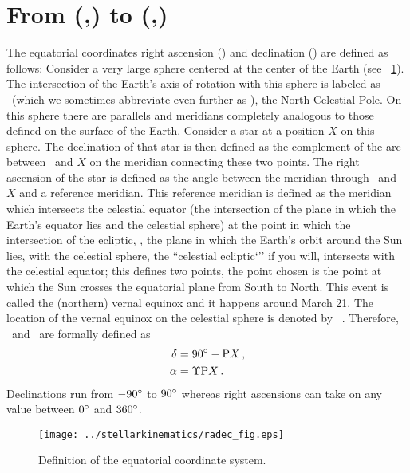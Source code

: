 
\section{From (\ra,\dec) to (\gall,\galb)}

The equatorial coordinates right ascension (\ra) and declination
(\dec) are defined as follows: Consider a very large sphere centered
at the center of the Earth (see \figurename~\ref{fig:eq}). The
intersection of the Earth's axis of rotation with this sphere is
labeled as \ncp\ (which we sometimes abbreviate even further as
\ncpp), the North Celestial Pole. On this sphere there are parallels
and meridians completely analogous to those defined on the surface of
the Earth. Consider a star at a position $X$ on this sphere. The
declination of that star is then defined as the complement of the arc
between \ncp\ and $X$ on the meridian connecting these two points. The
right ascension of the star is defined as the angle between the
meridian through \ncp\ and $X$ and a reference meridian. This
reference meridian is defined as the meridian which intersects the
celestial equator (the intersection of the plane in which the Earth's
equator lies and the celestial sphere) at the point in which the
intersection of the ecliptic, \ie, the plane in which the Earth's
orbit around the Sun lies, with the celestial sphere, the ``celestial
ecliptic`'' if you will, intersects with the celestial equator; this
defines two points, the point chosen is the point at which the Sun
crosses the equatorial plane from South to North. This event is called
the (northern) vernal equinox and it happens around March 21. The
location of the vernal equinox on the celestial sphere is denoted by
\vernal\ \citep[][pp.14-6]{Green85a}. Therefore, \ra\ and \dec\ are
formally defined as
\begin{align}
\delta &= 90^{\circ} - \textnormal{P} X\, ,\\
\alpha &= \Upsilon \textnormal{P} X \, .
\end{align}
Declinations run from $-90^{\circ}$ to $90^{\circ}$ whereas right
ascensions can take on any value between $0^{\circ}$ and $360^{\circ}$.

\begin{figure}[htp]
\begin{center}
\texttt{[image: ../stellarkinematics/radec\_fig.eps]}
\caption{Definition of the equatorial coordinate system.}\label{fig:eq}
\end{center}
\end{figure}

